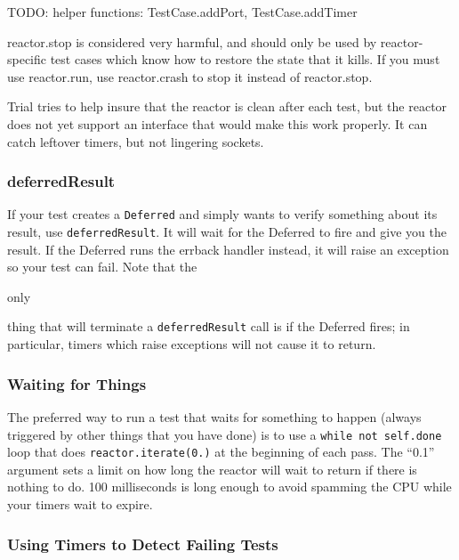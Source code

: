 TODO: helper functions: TestCase.addPort, TestCase.addTimer

reactor.stop is considered very harmful, and should only be used by reactor-specific test cases which know how to restore the state that it kills. If you must use reactor.run, use reactor.crash to stop it instead of reactor.stop.

Trial tries to help insure that the reactor is clean after each test, but the reactor does not yet support an interface that would make this work properly. It can catch leftover timers, but not lingering sockets.

\subsubsection{deferredResult}


If your test creates a \texttt{Deferred} and simply wants to verify something about its result, use \texttt{deferred\linebreak[1]Result}. It will wait for the Deferred to fire and give you the result. If the Deferred runs the errback handler instead, it will raise an exception so your test can fail. Note that the \begin{em}only\end{em} thing that will terminate a \texttt{deferred\linebreak[1]Result} call is if the Deferred fires; in particular, timers which raise exceptions will not cause it to return.

\subsubsection{Waiting for Things}


The preferred way to run a test that waits for something to happen (always triggered by other things that you have done) is to use a \texttt{while not self.\linebreak[1]done} loop that does \texttt{reactor.\linebreak[1]iterate(0.)} at the beginning of each pass. The ``0.1'' argument sets a limit on how long the reactor will wait to return if there is nothing to do. 100 milliseconds is long enough to avoid spamming the CPU while your timers wait to expire.

\subsubsection{Using Timers to Detect Failing Tests}


